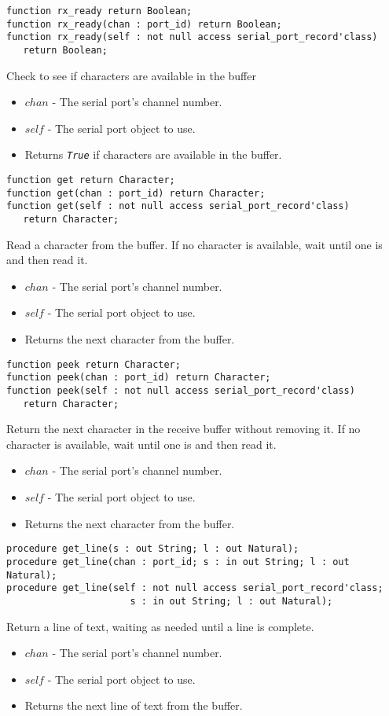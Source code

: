 \documentclass[10pt, openany]{book}
\newcommand{\indexfunc}[1]{\index[func]{#1}}
\newcommand{\constant}[1]{\emph{\texttt{#1}}}
\begin{document}
\begin{lstlisting}
function rx_ready return Boolean;
function rx_ready(chan : port_id) return Boolean;
function rx_ready(self : not null access serial_port_record'class)
   return Boolean;
\end{lstlisting}
\indexfunc{rx\_ready}
Check to see if characters are available in the buffer
\begin{itemize}
  \item $chan$ - The serial port's channel number.
  \item $self$ - The serial port object to use.
  \item Returns \constant{True} if characters are available in the buffer.
\end{itemize}

\begin{lstlisting}
function get return Character;
function get(chan : port_id) return Character;
function get(self : not null access serial_port_record'class)
   return Character;
\end{lstlisting}
\indexfunc{get}
Read a character from the buffer.  If no character is available, wait until one is and then read it.
\begin{itemize}
  \item $chan$ - The serial port's channel number.
  \item $self$ - The serial port object to use.
  \item Returns the next character from the buffer.
\end{itemize}

\begin{lstlisting}
function peek return Character;
function peek(chan : port_id) return Character;
function peek(self : not null access serial_port_record'class)
   return Character;
\end{lstlisting}
\indexfunc{peek}
Return the next character in the receive buffer without removing it.  If no character is available, wait until one is and then read it.
\begin{itemize}
  \item $chan$ - The serial port's channel number.
  \item $self$ - The serial port object to use.
  \item Returns the next character from the buffer.
\end{itemize}

\begin{lstlisting}
procedure get_line(s : out String; l : out Natural);
procedure get_line(chan : port_id; s : in out String; l : out Natural);
procedure get_line(self : not null access serial_port_record'class;
                      s : in out String; l : out Natural);
\end{lstlisting}
\indexfunc{get\_line}
Return a line of text, waiting as needed until a line is complete.
\begin{itemize}
  \item $chan$ - The serial port's channel number.
  \item $self$ - The serial port object to use.
  \item Returns the next line of text from the buffer.
\end{itemize}
\end{document}
